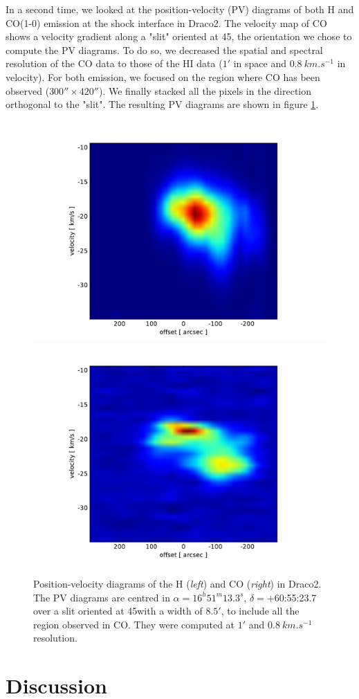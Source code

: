 \documentclass[traditabstract]{aa}
\begin{document}
   In a second time, we looked at the position-velocity (PV) diagrams of both H and CO(1-0) emission at the shock interface in Draco2. The velocity map of CO shows a velocity gradient along a "slit" oriented at 45\degree, the orientation we chose to compute the PV diagrams. To do so, we decreased the spatial and spectral resolution of the CO data to those of the HI data ($1'$ in space and $0.8\: km.s^{-1}$ in velocity). For both emission, we focused on the region where CO has been observed ($300''\times 420''$). We finally stacked all the pixels in the direction orthogonal to the "slit". The resulting PV diagrams are shown in figure \ref{PV-diag}.

\begin{figure}[h!]
  \centering
  \includegraphics[width=0.48\linewidth,trim=70 10 95 40,clip=true]{Figures/PV_diagram_HI.pdf}
  \hspace{3mm}
  \includegraphics[width=0.48\linewidth,trim=70 10 95 40,clip=true]{Figures/PV_diagram_CO.pdf}
  \caption{\label{PV-diag} Position-velocity diagrams of the H (\emph{left}) and CO (\emph{right}) in Draco2. The PV diagrams are centred in $\alpha=16^h 51^m 13.3^s$, $\delta=+$60:55:23.7 over a slit oriented at 45\degree with a width of $8.5'$, to include all the region observed in CO. They were computed at $1'$ and $0.8\: km.s^{-1}$ resolution.}
\end{figure}




\section{Discussion}
\label{sec:discussion}
\end{document}
